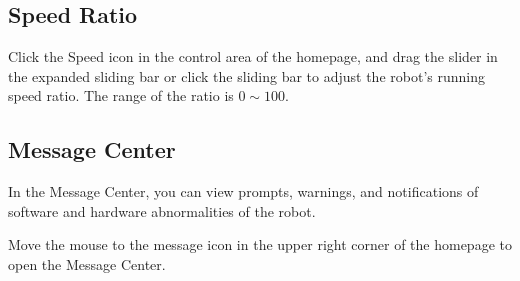 \subsection{Speed Ratio}
Click the Speed icon in the control area of the \LM homepage, and drag the slider in the expanded sliding bar or click the sliding bar to adjust the robot's running speed ratio. The range of the ratio is $0\sim 100$.


\subsection{Message Center}
In the Message Center, you can view prompts, warnings, and notifications of software and hardware abnormalities of the robot.

Move the mouse to the message icon \colorbox{black}{} in the upper right corner of the \LM homepage to open the Message Center.

